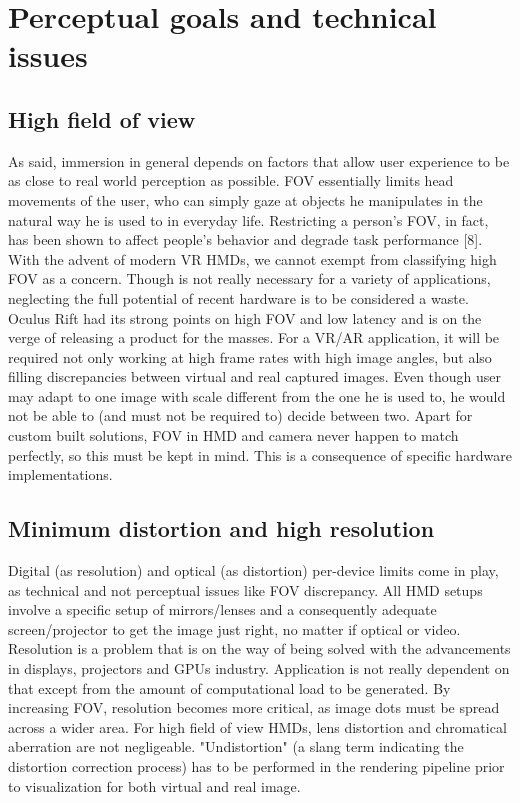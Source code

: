 \section{Perceptual goals and technical issues}
\subsection{High field of view}
As said, immersion in general depends on factors that allow user experience to be as close to real world perception as possible. FOV essentially limits head movements of the user, who can simply gaze at objects he manipulates in the natural way he is used to in everyday life. Restricting a person’s FOV, in fact, has been shown to affect people’s behavior and degrade task performance [8]. With the advent of modern VR HMDs, we cannot exempt from classifying high FOV as a concern. Though is not really necessary for a variety of applications, neglecting the full potential of recent hardware is to be considered a waste. Oculus Rift had its strong points on high FOV and low latency and is on the verge of releasing a product for the masses. For a VR/AR application, it will be required not only working at high frame rates with high image angles, but also filling discrepancies between virtual and real captured images. Even though user may adapt to one image with scale different from the one he is used to, he would not be able to (and must not be required to) decide between two. Apart for custom built solutions, FOV in HMD and camera never happen to match perfectly, so this must be kept in mind. This is a consequence of specific hardware implementations.

\subsection{Minimum distortion and high resolution}
Digital (as resolution) and optical (as distortion) per-device limits come in play, as technical and not perceptual issues like FOV discrepancy. All HMD setups involve a specific setup of mirrors/lenses and a consequently adequate screen/projector to get the image just right, no matter if optical or video. Resolution is a problem that is on the way of being solved with the advancements in displays, projectors and GPUs industry. Application is not really dependent on that except from the amount of computational load to be generated. By increasing FOV, resolution becomes more critical, as image dots must be spread across a wider area.
For high field of view HMDs, lens distortion and chromatical aberration are not negligeable. "Undistortion" (a slang term indicating the distortion correction process) has to be performed in the rendering pipeline prior to visualization for both virtual and real image.

